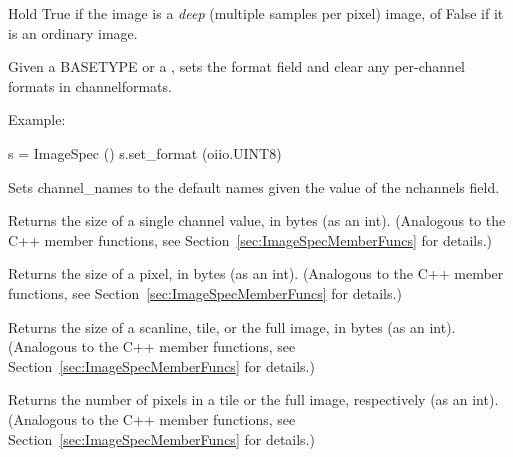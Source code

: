 Hold {\cf True} if the image is a \emph{deep} (multiple samples per pixel)
image, of {\cf False} if it is an ordinary image.
\apiend

Given a {\cf BASETYPE} or a \TypeDesc, sets the {\cf format} field and
clear any per-channel formats in {\cf channelformats}.

\noindent Example:
\begin{code}
    s = ImageSpec ()
    s.set_format (oiio.UINT8)
\end{code}
\apiend

Sets {\cf channel_names} to the default names given the value of
the {\cf nchannels} field.
\apiend

Returns the size of a single channel value, in bytes (as an
{\cf int}).
(Analogous to the C++ member functions, see 
Section~\ref{sec:ImageSpecMemberFuncs} for details.)
\apiend

Returns the size of a pixel, in bytes (as an {\cf int}).
(Analogous to the C++ member functions, see 
Section~\ref{sec:ImageSpecMemberFuncs} for details.)
\apiend

Returns the size of a scanline, tile, or the full image, in bytes (as an
{\cf int}). (Analogous to the C++ member functions, see 
Section~\ref{sec:ImageSpecMemberFuncs} for details.)
\apiend

Returns the number of pixels in a tile or the full image, respectively
(as an {\cf int}). (Analogous to the C++ member functions, see 
Section~\ref{sec:ImageSpecMemberFuncs} for details.)
\apiend


